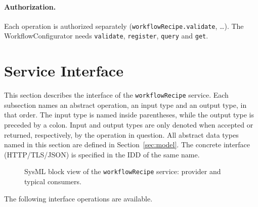\documentclass[a4paper]{arrowhead}
\begin{document}
\paragraph{Authorization.} Each operation is authorized separately (\texttt{workflow\allowbreak{}Recipe.\allowbreak{}validate}, \ldots). The WorkflowConfigurator needs \texttt{validate}, \texttt{register}, \texttt{query} and \texttt{get}.

\newpage
\section{Service Interface}
\label{sec:operations}
This section describes the interface of the \texttt{workflow\allowbreak{}Recipe} service. Each subsection names an abstract operation,
an input type and an output type, in that order. The input type is named inside parentheses, while the output type is
preceded by a colon. Input and output types are only denoted when accepted or returned, respectively, by the operation
in question. All abstract data types named in this section are defined in Section~\ref{sec:model}. The concrete
interface (HTTP/TLS/JSON) is specified in the IDD of the same name.

\begin{figure}[ht!]
  \centering
  \caption{SysML block view of the \texttt{workflowRecipe} service: provider and typical consumers.}
  \label{fig:SD}
\end{figure}

The following interface operations are available.
\end{document}
